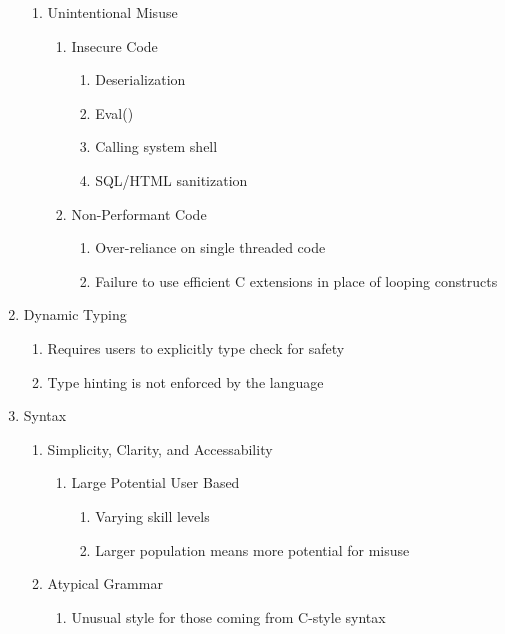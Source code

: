 \begin{enumerate}
\begin{enumerate}
                \item Unintentional Misuse
                \begin{enumerate}
                        \item Insecure Code
                        \begin{enumerate}
                                \item Deserialization
                                \item Eval()
                                \item Calling system shell
                                \item SQL/HTML sanitization
                        \end{enumerate}
                        \item Non-Performant Code
                        \begin{enumerate}
                                \item Over-reliance on single threaded code
                                \item Failure to use efficient C extensions in place of looping constructs
                        \end{enumerate}
                \end{enumerate}
        \end{enumerate} %

        \item Dynamic Typing
        \begin{enumerate}
                \item Requires users to explicitly type check for safety
                \item Type hinting is not enforced by the language
        \end{enumerate}           

        \item Syntax
        \begin{enumerate}
                \item Simplicity, Clarity, and Accessability
                \begin{enumerate}
                        \item Large Potential User Based
                        \begin{enumerate}
                                \item Varying skill levels
                                \item Larger population means more potential for misuse
                        \end{enumerate}
                \end{enumerate}
                \item Atypical Grammar
                \begin{enumerate}
                        \item Unusual style for those coming from C-style syntax
                \end{enumerate}
        \end{enumerate} %


\end{enumerate}
